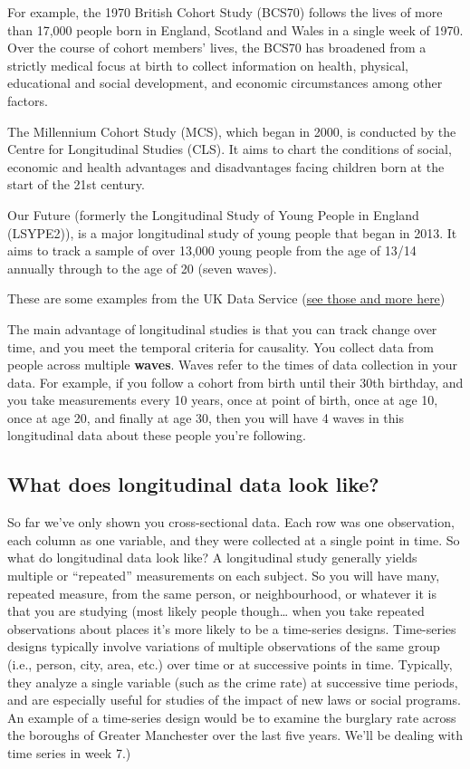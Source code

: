 \documentclass[
]{book}
\begin{document}
For example, the 1970 British Cohort Study (BCS70) follows the lives of more than 17,000 people born in England, Scotland and Wales in a single week of 1970. Over the course of cohort members' lives, the BCS70 has broadened from a strictly medical focus at birth to collect information on health, physical, educational and social development, and economic circumstances among other factors.

The Millennium Cohort Study (MCS), which began in 2000, is conducted by the Centre for Longitudinal Studies (CLS). It aims to chart the conditions of social, economic and health advantages and disadvantages facing children born at the start of the 21st century.

Our Future (formerly the Longitudinal Study of Young People in England (LSYPE2)), is a major longitudinal study of young people that began in 2013. It aims to track a sample of over 13,000 young people from the age of 13/14 annually through to the age of 20 (seven waves).

These are some examples from the UK Data Service (\href{https://www.ukdataservice.ac.uk/get-data/key-data/cohort-and-longitudinal-studies}{see those and more here})

The main advantage of longitudinal studies is that you can track change over time, and you meet the temporal criteria for causality. You collect data from people across multiple \textbf{waves}. Waves refer to the times of data collection in your data. For example, if you follow a cohort from birth until their 30th birthday, and you take measurements every 10 years, once at point of birth, once at age 10, once at age 20, and finally at age 30, then you will have 4 waves in this longitudinal data about these people you're following.

\hypertarget{what-does-longitudinal-data-look-like}{%
\subsection{What does longitudinal data look like?}\label{what-does-longitudinal-data-look-like}}

So far we've only shown you cross-sectional data. Each row was one observation, each column as one variable, and they were collected at a single point in time. So what do longitudinal data look like?
A longitudinal study generally yields multiple or ``repeated'' measurements on each subject. So you will have many, repeated measure, from the same person, or neighbourhood, or whatever it is that you are studying (most likely people though\ldots{} when you take repeated observations about places it's more likely to be a time-series designs. Time-series designs typically involve variations of multiple observations of the same group (i.e., person, city, area, etc.) over time or at successive points in time. Typically, they analyze a single variable (such as the crime rate) at successive time periods, and are especially useful for studies of the impact of new laws or social programs. An example of a time-series design would be to examine the burglary rate across the boroughs of Greater Manchester over the last five years. We'll be dealing with time series in week 7.)
\end{document}
